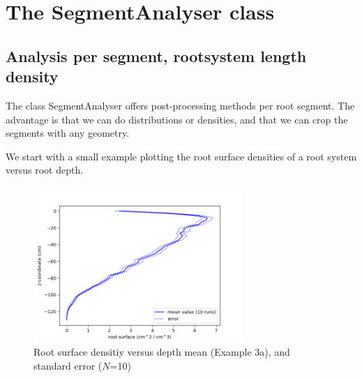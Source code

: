 \section{The SegmentAnalyser class} \label{sec:sa}

\subsection{Analysis per segment, rootsystem length density}

The class SegmentAnalyser offers post-processing methods per root segment. The advantage is that we can do distributions or densities, and that we can crop the segments with any geometry. 

We start with a small example plotting the root surface densities of a root system versus root depth.



\begin{figure}
\centering
\includegraphics[width=0.7\textwidth]{example_3c.png}
\caption{Root surface densitiy versus depth mean (Example 3a), and standard error ($N$=10)} \label{fig:surface_density}
\end{figure}


